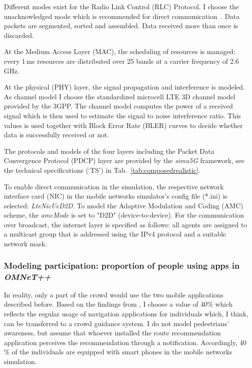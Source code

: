

Different modes exist for the Radio Link Control (RLC) Protocol. I choose the unacknowledged mode which is recommended for direct communication~\cite{nardini-2018-com}. Data packets are segmented, sorted and assembled. Data received more than once is discarded. 


At the Medium Access Layer (MAC), the scheduling of resources is managed: every 1\,ms resources are distributed over 25 bands at a carrier frequency of 2.6\,GHz. 


At the physical (PHY) layer, the signal propagation and interference is modeled. As channel model I choose the standardized microcell LTE 3D channel model provided by the 3GPP. The channel model computes the power of a received signal which is then used to estimate the signal to noise interference ratio. This values is used together with Block Error Rate (BLER) curves to decide whether data is successfully received or not. 

The protocols and models of the four layers including the Packet Data Convergence Protocol (PDCP) layer are provided by the \textit{simu5G} framework, see the technical specifications (`TS') in Tab.~\ref{tab:composedrealistic}.


To enable direct communication in the simulation, the respective network interface card (NIC) in the mobile networks simulator's config file (*.ini) is selected: \textit{LteNicUeD2D}. To model the Adaptive Modulation and Coding (AMC) scheme, the \textit{amcMode} is set to "D2D" (device-to-device).
For the communication over broadcast, the internet layer is specified as follows: all agents are assigned to a multicast group that is addressed using the IPv4 protocol and a suitable network mask. 


\subsubsection{Modeling participation: proportion of people using apps in \textit{OMNeT++}}
In reality, only a part of the crowd would use the two mobile applications described before. Based on the findings from \cite{fonseca-2021-cdyn}, I choose a value of 40\% which reflects the regular usage of navigation applications for individuals which, I think, can be transferred to a crowd guidance system. I do not model pedestrians' awareness, but assume that whoever installed the route recommendation application perceives the recommendation through a notification. Accordingly, 40\,\% of the individuals are equipped with smart phones in the mobile networks simulation.



